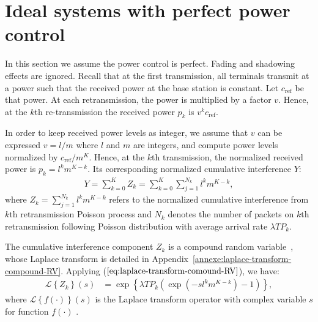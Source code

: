 \section{Ideal systems with perfect power control}
\label{sec:ideal_power_control}
In this section we assume the power control is perfect. Fading and shadowing effects are ignored. Recall that at the first transmission, all terminals transmit at a power such that the received power at the base station is constant. Let $c_{\mbox{ref}}$ be that power. At each retransmission, the power is multiplied by a factor $v$. Hence, at the $k$th re-transmission the received power $p_{k}$ is $v^k c_{\text{ref}}$. 

In order to keep received power levels as integer, we assume that $v$ can be expressed $v=l/m$ where $l$ and $m$ are integers, and compute power levels normalized by $c_{\mbox{ref}}/m^K$. Hence, at the $k$th transmission, the normalized received power is $p_k=l^k m^{K-k}$. Its corresponding normalized cumulative interference $Y$:
\begin{align}
	Y= \sum_{k=0}^{K} Z_k = \sum_{k=0}^{K} \sum_{j=1}^{N_k} l^k m^{K-k},
\end{align}
where $Z_k=\sum_{j=1}^{N_k} l^k m^{K-k}$ refers to the normalized cumulative interference from $k$th retransmission Poisson process and $N_k$ denotes the number of packets on $k$th retransmission following Poisson distribution with average arrival rate $\lambda T P_k$. 

The cumulative interference component $Z_k$ is a compound random variable~\cite{ross2014introduction}, whose Laplace transform is detailed in Appendix~\ref{annexe:laplace-transform-compound-RV}. Applying ($\ref{eq:laplace-transform-comound-RV}$), we have:
\begin{align*}
\mathcal{L} \left\lbrace Z_k \right\rbrace \left( s \right)
&= \exp\left\lbrace \lambda T P_k\left( \exp(-sl^k m^{K-k})-1\right)\right\rbrace, 
\end{align*}
where $\mathcal{L} \left\lbrace f(\cdot) \right\rbrace \left( s \right)$ is the Laplace transform operator with complex variable $s$ for function $f(\cdot)$ .


